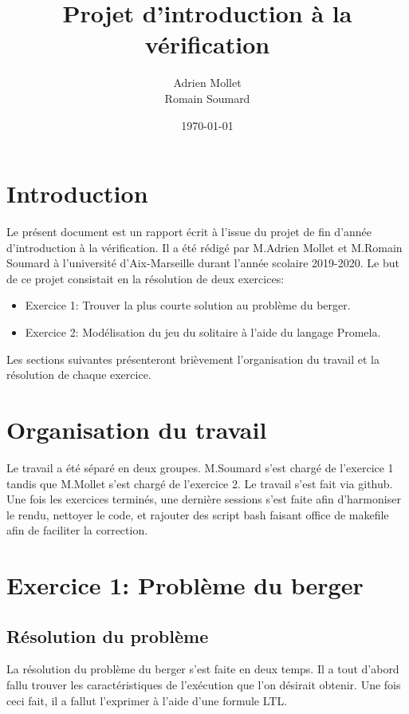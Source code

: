 \documentclass[12pt, a4paper]{report}
\title{\color{blue}Projet d'introduction à la vérification}
\date{\today}
\author{Adrien Mollet\\ Romain Soumard}
\begin{document}
\maketitle

\section{Introduction}

Le présent document est un rapport écrit à l'issue du projet de fin d'année d'introduction à la vérification. Il a été rédigé par M.Adrien Mollet et M.Romain Soumard à l'université d'Aix-Marseille durant l'année scolaire 2019-2020.
Le but de ce projet consistait en la résolution de deux exercices:
\begin{itemize}
\item Exercice 1:  Trouver la plus courte solution au problème du berger.
\item Exercice 2: Modélisation du jeu du solitaire à l'aide du langage Promela.
\end{itemize}
Les sections suivantes présenteront brièvement l'organisation du travail et la résolution de chaque exercice.

\section{Organisation du travail}

Le travail a été séparé en deux groupes. M.Soumard s'est chargé de l'exercice 1 tandis que M.Mollet s'est chargé de l'exercice 2. Le travail s'est fait via github. Une fois les exercices terminés, une dernière sessions s'est faite afin d'harmoniser le rendu, nettoyer le code, et rajouter des script bash faisant office de makefile afin de faciliter la correction.

\section{Exercice 1: Problème du berger}

\subsection{Résolution du problème}

La résolution du problème du berger s'est faite en deux temps. Il a tout d'abord fallu trouver les caractéristiques de l'exécution que l'on désirait obtenir. Une fois ceci fait, il a fallut l'exprimer à l'aide d'une formule LTL.
\end{document}
